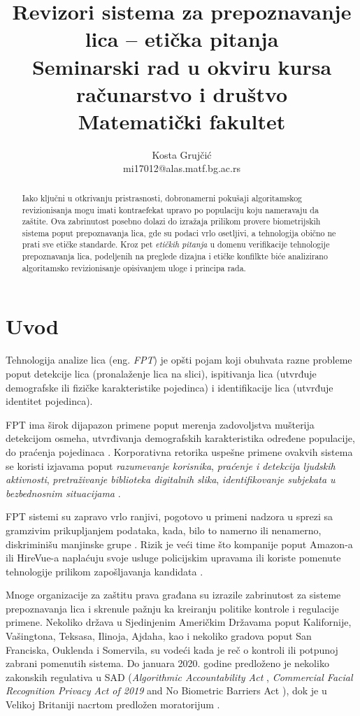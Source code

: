 \documentclass[11pt, a4paper]{article}
\title{Revizori sistema za prepoznavanje lica -- etička pitanja\\\small{Seminarski rad u okviru kursa\\računarstvo i društvo\\Matematički fakultet}}
\author{Kosta Grujčić\\mi17012@alas.matf.bg.ac.rs}
\begin{document}
\maketitle

\begin{abstract}
    Iako ključni u otkrivanju pristrasnosti, dobronamerni pokušaji algoritamskog revizionisanja mogu imati kontraefekat upravo po populaciju koju nameravaju da zaštite. Ova zabrinutost posebno dolazi do izražaja prilikom provere biometrijskih sistema poput prepoznavanja lica, gde su podaci vrlo osetljivi, a tehnologija obično ne prati sve etičke standarde. Kroz pet \textit{etičkih pitanja} u domenu verifikacije tehnologije prepoznavanja lica, podeljenih na preglede dizajna i etičke konfilkte biće analizirano algoritamsko revizionisanje opisivanjem uloge i principa rada.
\end{abstract}

\tableofcontents

\section{Uvod}
Tehnologija analize lica (eng. \textit{FPT}) je opšti pojam koji obuhvata razne probleme poput detekcije lica (pronalaženje lica na slici), ispitivanja lica (utvrđuje demografske ili fizičke karakteristike pojedinca) i identifikacije lica (utvrđuje identitet pojedinca).

FPT ima širok dijapazon primene poput merenja zadovoljstva mušterija detekcijom osmeha, utvrđivanja demografskih karakteristika određene populacije, do praćenja pojedinaca \cite{G37}. Korporativna retorika uspešne primene ovakvih sistema se koristi izjavama poput \textit{razumevanje korisnika}, \textit{praćenje i detekcija ljudskih aktivnosti}, \textit{pretraživanje biblioteka digitalnih slika}, \textit{identifikovanje subjekata u bezbednosnim situacijama} \cite{G1, G8, G16, G33}.

FPT sistemi su zapravo vrlo ranjivi, pogotovo u primeni nadzora u sprezi sa gramzivim prikupljanjem podataka, kada, bilo to namerno ili nenamerno, diskriminišu manjinske grupe \cite{G2}. Rizik je veći time što kompanije poput Amazon-a ili HireVue-a naplaćuju svoje usluge policijskim upravama ili koriste pomenute tehnologije prilikom zapošljavanja kandidata \cite{G5, G43}.

Mnoge organizacije za zaštitu prava građana su izrazile zabrinutost za sisteme prepoznavanja lica i skrenule pažnju ka kreiranju politike kontrole i regulacije primene. Nekoliko država u Sjedinjenim Američkim Državama poput Kalifornije, Vašingtona, Teksasa, Ilinoja, Ajdaha, kao i nekoliko gradova poput San Franciska, Ouklenda i Somervila, su vodeći kada je reč o kontroli ili potpunoj zabrani pomenutih sistema. Do januara 2020. godine predloženo je nekoliko zakonskih regulativa u SAD (\textit{Algorithmic Accountability Act} \cite{G9}, \textit{Commercial Facial Recognition Privacy Act of 2019} \cite{G4} and No Biometric Barriers Act \cite{G10}), dok je u Velikoj Britaniji nacrtom predložen moratorijum \cite{G11}.
\end{document}
